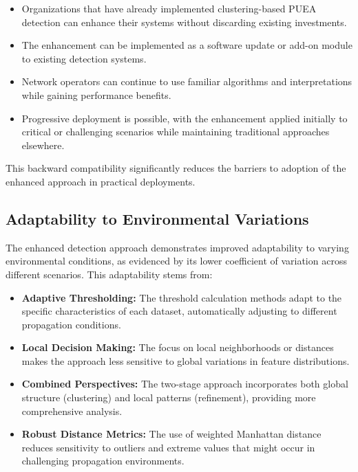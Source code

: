 \begin{itemize}
    \item Organizations that have already implemented clustering-based PUEA detection can enhance their systems without discarding existing investments.
    
    \item The enhancement can be implemented as a software update or add-on module to existing detection systems.
    
    \item Network operators can continue to use familiar algorithms and interpretations while gaining performance benefits.
    
    \item Progressive deployment is possible, with the enhancement applied initially to critical or challenging scenarios while maintaining traditional approaches elsewhere.
\end{itemize}

This backward compatibility significantly reduces the barriers to adoption of the enhanced approach in practical deployments.

\subsection{Adaptability to Environmental Variations}

The enhanced detection approach demonstrates improved adaptability to varying environmental conditions, as evidenced by its lower coefficient of variation across different scenarios. This adaptability stems from:

\begin{itemize}
    \item \textbf{Adaptive Thresholding:} The threshold calculation methods adapt to the specific characteristics of each dataset, automatically adjusting to different propagation conditions.
    
    \item \textbf{Local Decision Making:} The focus on local neighborhoods or distances makes the approach less sensitive to global variations in feature distributions.
    
    \item \textbf{Combined Perspectives:} The two-stage approach incorporates both global structure (clustering) and local patterns (refinement), providing more comprehensive analysis.
    
    \item \textbf{Robust Distance Metrics:} The use of weighted Manhattan distance reduces sensitivity to outliers and extreme values that might occur in challenging propagation environments.
\end{itemize}

